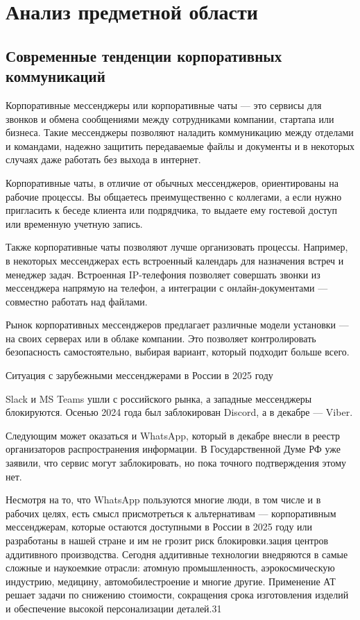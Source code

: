 \section{Анализ предметной области}
\subsection{Современные тенденции корпоративных коммуникаций}

Корпоративные мессенджеры или корпоративные чаты — это сервисы для звонков и обмена сообщениями между сотрудниками компании, стартапа или бизнеса. Такие мессенджеры позволяют наладить коммуникацию между отделами и командами, надежно защитить передаваемые файлы и документы и в некоторых случаях даже работать без выхода в интернет.  

Корпоративные чаты, в отличие от обычных мессенджеров, ориентированы на рабочие процессы. Вы общаетесь преимущественно с коллегами, а если нужно пригласить к беседе клиента или подрядчика, то выдаете ему гостевой доступ или временную учетную запись. 

Также корпоративные чаты позволяют лучше организовать процессы. Например, в некоторых мессенджерах есть встроенный календарь для назначения встреч и менеджер задач. Встроенная IP-телефония позволяет совершать звонки из мессенджера напрямую на телефон, а интеграции с онлайн-документами — совместно работать над файлами.

Рынок корпоративных мессенджеров предлагает различные модели установки — на своих серверах или в облаке компании. Это позволяет контролировать безопасность самостоятельно, выбирая вариант, который подходит больше всего.

Ситуация с зарубежными мессенджерами в России в 2025 году

Slack и MS Teams ушли с российского рынка, а западные мессенджеры блокируются. Осенью 2024 года был заблокирован Discord, а в декабре — Viber.

Следующим может оказаться и WhatsApp, который в декабре внесли в реестр организаторов распространения информации. В Государственной Думе РФ уже заявили, что сервис могут заблокировать, но пока точного подтверждения этому нет.

Несмотря на то, что WhatsApp пользуются многие люди, в том числе и в рабочих целях, есть смысл присмотреться к альтернативам — корпоративным мессенджерам, которые остаются доступными в России в 2025 году или разработаны в нашей стране и им не грозит риск блокировки.зация центров аддитивного производства. Сегодня аддитивные технологии внедряются в самые сложные и наукоемкие отрасли: атомную промышленность, аэрокосмическую индустрию, медицину, автомобилестроение и многие другие. Применение АТ решает задачи по снижению стоимости, сокращения срока изготовления изделий и обеспечение высокой персонализации деталей.31
